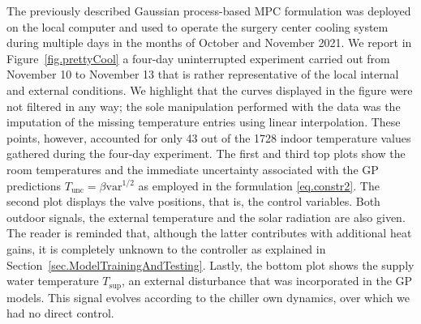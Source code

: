 The previously described Gaussian process-based MPC formulation was deployed on the local computer and used to operate the surgery center cooling system during multiple days in the months of October and November 2021. We report in Figure~\ref{fig.prettyCool} a four-day uninterrupted experiment carried out from November 10 to November 13 that is rather representative of the local internal and external conditions. We highlight that the curves displayed in the figure were not filtered in any way; the sole manipulation performed with the data was the imputation of the missing temperature entries using linear interpolation. These points, however, accounted for only 43 out of the 1728 indoor temperature values gathered during the four-day experiment. The first and third top plots show the room temperatures and the immediate uncertainty associated with the GP predictions $T_\text{unc} = \beta \text{var}^{1/2}$ as employed in the formulation \eqref{eq.constr2}. The second plot displays the valve positions, that is, the control variables. Both outdoor signals, the external temperature and the solar radiation are also given. The reader is reminded that, although the latter contributes with additional heat gains, it is completely unknown to the controller as explained in Section~\ref{sec.ModelTrainingAndTesting}. Lastly, the bottom plot shows the supply water temperature $T_\text{sup}$, an external disturbance that was incorporated in the GP models. This signal evolves according to the chiller own dynamics, over which we had no direct control.


